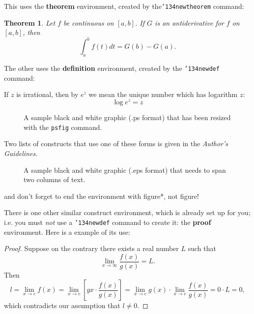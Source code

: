 \documentclass{acm_proc_article-sp}
\begin{document}
This uses the \textbf{theorem} environment, created by
the\linebreak\texttt{{\char'134}newtheorem} command:
\newtheorem{theorem}{Theorem}
\begin{theorem}
Let $f$ be continuous on $[a,b]$.  If $G$ is
an antiderivative for $f$ on $[a,b]$, then
\begin{displaymath}\int^b_af(t)dt = G(b) - G(a).\end{displaymath}
\end{theorem}

The other uses the \textbf{definition} environment, created
by the \texttt{{\char'134}newdef} command:
\begin{definition}
If $z$ is irrational, then by $e^z$ we mean the
unique number which has
logarithm $z$: \begin{displaymath}{\log e^z = z}\end{displaymath}
\end{definition}

\begin{figure}
\centering
\caption{A sample black and white graphic (.ps format) that has
been resized with the \texttt{psfig} command.}
\end{figure}

Two lists of constructs that use one of these
forms is given in the
\textit{Author's  Guidelines}.

\begin{figure}
\centering
\caption{A sample black and white graphic (.eps format)
that needs to span two columns of text.}
\end{figure}
and don't forget to end the environment with
{figure*}, not {figure}!
 
There is one other similar construct environment, which is
already set up
for you; i.e. you must \textit{not} use
a \texttt{{\char'134}newdef} command to
create it: the \textbf{proof} environment.  Here
is a example of its use:
\begin{proof}
Suppose on the contrary there exists a real number $L$ such that
\begin{displaymath}
\lim_{x\rightarrow\infty} \frac{f(x)}{g(x)} = L.
\end{displaymath}
Then
\begin{displaymath}
l=\lim_{x\rightarrow c} f(x)
= \lim_{x\rightarrow c}
\left[ g{x} \cdot \frac{f(x)}{g(x)} \right ]
= \lim_{x\rightarrow c} g(x) \cdot \lim_{x\rightarrow c}
\frac{f(x)}{g(x)} = 0\cdot L = 0,
\end{displaymath}
which contradicts our assumption that $l\neq 0$.
\end{proof}
\end{document}
